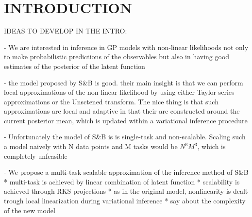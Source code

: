 \section{INTRODUCTION}
% 

IDEAS TO DEVELOP IN THE INTRO:

\citet{steinberg-bonilla-nips-2014}


- We are interested in inference in GP models with non-linear likelihoods
not only to make probabilistic predictions of the observables but also in having
good estimates of the posterior of the latent function

- the model proposed by S\&B \citep{steinberg-bonilla-nips-2014}
  is good. their main insight is that we can perform 
local approximations of the non-linear likelihood by using either Taylor series 
approximations  or the Unsctened transform. The nice thing is that such approximations
are local and adaptive in that their are constructed around the current posterior 
mean, which is updated within a variational inference procedure 

- Unfortunately the model of S\&B is  is single-task and non-scalable. 
Scaling such a model naively with N data points and M tasks would be $N^3M^3$,
which is completely unfeasible

- We propose a multi-task scalable approximation of  the inference method of S\&B 
* multi-task is achieved by linear combination of latent function
* scalability is achieved through RKS  projections 
* as in the original model, nonlinearity is dealt trough local linearization during 
variational inference
* say about the complexity of the new model 




